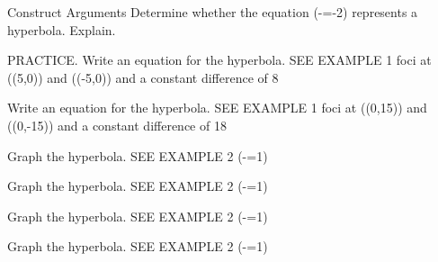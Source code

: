 \documentclass{article}
\newenvironment{practice}[2]{}{}        %
\newcommand{\answer}[1]{}               %
\newcommand{\placeholder}[2]{}          %
\begin{document}
\begin{practice}{17}{2}
Construct Arguments Determine whether the equation (-=-2) represents a hyperbola. Explain.
\answer{The equation (\frac{x^2}{18}-\frac{y^2}{32}=-2) is a hyperbola because after dividing both sides of the equation by (-2), the result is (-\frac{x^2}{36}+\frac{y^2}{64}=1). Then the (x^2)- and (y^2)-terms can be switched using the Commutative Property of Addition. The result is (\frac{y^2}{64}-\frac{x^2}{36}=1), which is in the general form of the equation of a hyperbola.}
\end{practice}
\begin{practice}{18}{1}
PRACTICE. Write an equation for the hyperbola. SEE EXAMPLE 1
foci at ((5,0)) and ((-5,0)) and a constant difference of 8
\answer{(\frac{x^2}{16}-\frac{y^2}{9}=1)}
\end{practice}
\begin{practice}{19}{1}
Write an equation for the hyperbola. SEE EXAMPLE 1
foci at ((0,15)) and ((0,-15)) and a constant difference of 18
\answer{(\frac{y^2}{81}-\frac{x^2}{144}=1)}
\end{practice}
\begin{practice}{20}{1}
Graph the hyperbola. SEE EXAMPLE 2
(-=1)
\answer{See graph.}
\placeholder{graph}{Answer 20: unit grid [-5,5] both axes, black arrowed x/y axes, O and labels +/-2,+/-4. Red vertical hyperbola y^2/4-x^2/9=1, vertices (0,+/-2), four arrowheads.}
\end{practice}
\begin{practice}{21}{1}
Graph the hyperbola. SEE EXAMPLE 2
(-=1)
\answer{See graph.}
\placeholder{graph}{Answer 21: unit grid [-5,5] both axes, black arrowed x/y axes, O and labels +/-2,+/-4. Red narrow horizontal hyperbola x^2-y^2/25=1, vertices (+/-1,0), four arrowheads.}
\end{practice}
\begin{practice}{22}{1}
Graph the hyperbola. SEE EXAMPLE 2
(-=1)
\answer{See graph.}
\placeholder{graph}{Answer 22: unit grid [-5,5] both axes, black arrowed x/y axes, O and labels +/-2,+/-4. Red horizontal hyperbola x^2/16-y^2/36=1, vertices (+/-4,0), four arrowheads.}
\end{practice}
\begin{practice}{23}{1}
Graph the hyperbola. SEE EXAMPLE 2
(-=1)
\answer{See graph.}
\placeholder{graph}{Answer 23: grid [-12,12] both axes with spacing 2, black arrowed x/y axes, O and labels +/-4,+/-8. Red vertical hyperbola y^2/49-x^2/25=1, vertices (0,+/-7), four arrowheads.}
\end{practice}
\end{document}
